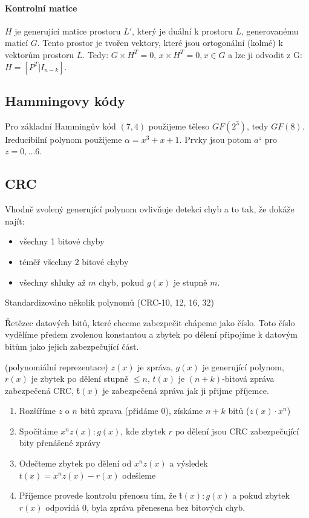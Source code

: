\documentclass[a4paper, 11pt]{report}
\begin{document}
\paragraph{Kontrolní matice} $H$ je generující matice prostoru $L'$, který je duální k prostoru $L$, generovanému maticí $G$. Tento prostor je tvořen vektory, které jsou ortogonální (kolmé) k vektorům prostoru $L$. Tedy: $G \times H^T = 0$, $x \times H^T = 0, x \in G$ a lze ji odvodit z G: $H = [P^T|I_{n-k}]$.

\subsection{Hammingovy kódy}
Pro základní Hammingův kód $(7, 4)$ použijeme těleso $GF(2^3)$, tedy $GF(8)$. Ireducibilní polynom použijeme $\alpha = x^3 + x + 1$. Prvky jsou potom $a^z$ pro $z = 0, \dots 6$.

\subsection{CRC}
Vhodně zvolený generující polynom ovlivňuje detekci chyb a to tak, že dokáže najít:
\begin{itemize}
	\item všechny 1 bitové chyby
	\item téměř všechny 2 bitové chyby
	\item všechny shluky až $m$ chyb, pokud $g(x)$ je stupně $m$.
\end{itemize}
Standardizováno několik polynomů (CRC-10, 12, 16, 32)

Řetězec datových bitů, které chceme zabezpečit chápeme jako číslo. Toto číslo vydělíme předem zvolenou konstantou a zbytek po dělení připojíme k datovým bitům jako jejich zabezpečující část.

(polynomiální reprezentace) $z(x)$ je zpráva, $g(x)$ je generující polynom, $r(x)$ je zbytek po dělení stupně $\leq n$, $t(x)$ je $(n+k)$-bitová zpráva zabezpečená CRC, \^{t}$(x)$ je zabezpečená zpráva jak ji přijme příjemce.
\begin{enumerate}
	\item Rozšíříme $z$ o $n$ bitů zprava (přidáme 0), získáme $n+k$ bitů ($z(x) \cdot x^n$)
	\item Spočítáme $x^n z(x): g(x)$, kde zbytek $r$ po dělení jsou CRC zabezpečující bity přenášené zprávy
	\item Odečteme zbytek po dělení od $x^n z(x)$ a výsledek $t(x) = x^n z(x) - r(x)$ odešleme
	\item Příjemce provede kontrolu přenosu tím, že \^{t}$(x):g(x)$ a pokud zbytek $r(x)$ odpovídá 0, byla zpráva přenesena bez bitových chyb.
\end{enumerate}
\end{document}
